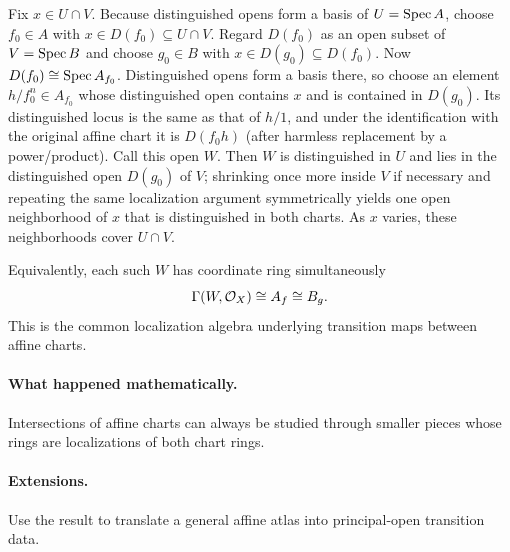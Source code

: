 \begin{solution}
Fix $x\in U\cap V$.  Because distinguished opens form a basis of $U=\operatorname{Spec} A$, choose $f_0\in A$ with
$x\in D(f_0)\subseteq U\cap V$.  Regard $D(f_0)$ as an open subset of $V=\operatorname{Spec} B$ and choose $g_0\in B$ with
$x\in D(g_0)\subseteq D(f_0)$.  Now $D(f_0)\cong\operatorname{Spec} A_{f_0}$.  Distinguished opens form a basis there, so choose an element $h/f_0^n\in A_{f_0}$ whose distinguished open contains $x$ and is contained in $D(g_0)$.  Its distinguished locus is the same as that of $h/1$, and under the identification with the original affine chart it is $D(f_0h)$ (after harmless replacement by a power/product).  Call this open $W$.  Then $W$ is distinguished in $U$ and lies in the distinguished open $D(g_0)$ of $V$; shrinking once more inside $V$ if necessary and repeating the same localization argument symmetrically yields one open neighborhood of $x$ that is distinguished in both charts.  As $x$ varies, these neighborhoods cover $U\cap V$.

Equivalently, each such $W$ has coordinate ring simultaneously
\[
\Gamma(W,\mathcal O_X)\cong A_f\cong B_g.
\]
This is the common localization algebra underlying transition maps between affine charts.
\end{solution}

\paragraph{What happened mathematically.}
Intersections of affine charts can always be studied through smaller pieces whose rings are localizations of both chart rings.

\paragraph{Extensions.}
Use the result to translate a general affine atlas into principal-open transition data.
\fi
